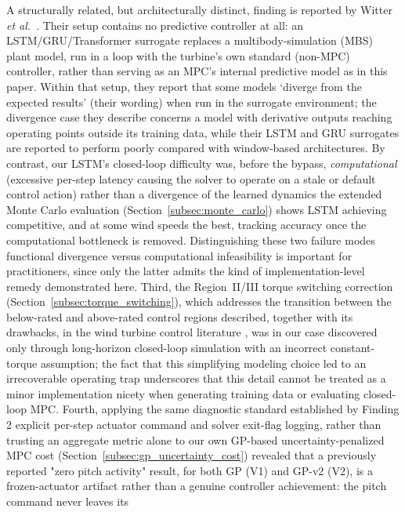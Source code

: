A structurally related, but architecturally distinct, finding is
reported by Witter \emph{et al.}~\cite{witter_creating_2025}. Their setup contains no
predictive controller at all: an LSTM/GRU/Transformer surrogate replaces
a multibody-simulation (MBS) plant model, run in a loop with the
turbine's own standard (non-MPC) controller, rather than serving as an
MPC's internal predictive model as in this paper. {\color{auditP2}Within that setup,
they report that some models `diverge from the expected results' (their
wording) when run in the surrogate environment; the divergence case they
describe concerns a model with derivative outputs reaching operating
points outside its training data, while their LSTM and GRU surrogates
are reported to perform poorly compared with window-based architectures.
By contrast,
our LSTM's closed-loop difficulty was, before the bypass,
\emph{computational} (excessive per-step latency causing the solver to
operate on a stale or default control action) rather than a divergence of
the learned dynamics}  the extended Monte Carlo evaluation
(Section~\ref{subsec:monte_carlo}) shows LSTM achieving competitive, and
at some wind speeds the best, tracking accuracy once the computational
bottleneck is removed. Distinguishing these two failure modes 
functional divergence versus computational infeasibility  is
important for practitioners, since only the latter admits the kind of
implementation-level remedy demonstrated here. {\color{auditP2}Third,
the Region~II/III torque switching correction
(Section~\ref{subsec:torque_switching}), which addresses the transition between
the below-rated and above-rated control regions described, together with its
drawbacks, in the wind turbine control literature \cite{bianchi2006,pao2009},
was in our case discovered only through long-horizon closed-loop simulation
with an incorrect constant-torque assumption; the fact that this simplifying
modeling choice led to an irrecoverable operating trap underscores that this
detail cannot be treated as a minor implementation nicety when generating
training data or evaluating closed-loop MPC.}
\label{subsec:gp_frozen_actuator_finding}
Fourth, applying the same diagnostic standard established by Finding 2
 explicit per-step actuator command and solver exit-flag logging,
rather than trusting an aggregate metric alone  to our own GP-based
uncertainty-penalized MPC cost (Section~\ref{subsec:gp_uncertainty_cost})
revealed that a previously reported "zero pitch activity" result, for
both GP (V1) and GP-v2 (V2), is a frozen-actuator artifact rather than a
genuine controller achievement: the pitch command never leaves its
